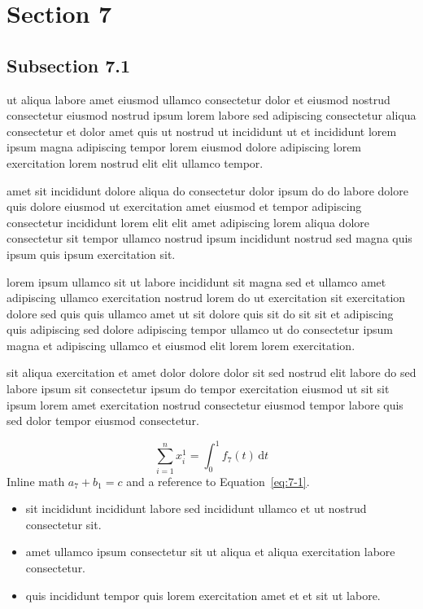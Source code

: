 \documentclass{article}
\begin{document}
\section{Section 7}\label{sec:7}
\subsection{Subsection 7.1}\label{sec:7-1}
ut aliqua labore amet eiusmod ullamco consectetur dolor et eiusmod nostrud consectetur eiusmod nostrud ipsum lorem labore sed adipiscing consectetur aliqua consectetur et dolor amet quis ut nostrud ut incididunt ut et incididunt lorem ipsum magna adipiscing tempor lorem eiusmod dolore adipiscing lorem exercitation lorem nostrud elit elit ullamco tempor.

amet sit incididunt dolore aliqua do consectetur dolor ipsum do do labore dolore quis dolore eiusmod ut exercitation amet eiusmod et tempor adipiscing consectetur incididunt lorem elit elit amet adipiscing lorem aliqua dolore consectetur sit tempor ullamco nostrud ipsum incididunt nostrud sed magna quis ipsum quis ipsum exercitation sit.

lorem ipsum ullamco sit ut labore incididunt sit magna sed et ullamco amet adipiscing ullamco exercitation nostrud lorem do ut exercitation sit exercitation dolore sed quis quis ullamco amet ut sit dolore quis sit do sit sit et adipiscing quis adipiscing sed dolore adipiscing tempor ullamco ut do consectetur ipsum magna et adipiscing ullamco et eiusmod elit lorem lorem exercitation.

sit aliqua exercitation et amet dolor dolore dolor sit sed nostrud elit labore do sed labore ipsum sit consectetur ipsum do tempor exercitation eiusmod ut sit sit ipsum lorem amet exercitation nostrud consectetur eiusmod tempor labore quis sed dolor tempor eiusmod consectetur.

\begin{equation}\label{eq:7-1}
  \sum_{i=1}^{n} x_i^{1} = \int_0^1 f_{7}(t)\,\mathrm{d}t
\end{equation}
Inline math $a_{7} + b_{1} = c$ and a reference to Equation~\eqref{eq:7-1}.

\begin{itemize}
  \item sit incididunt incididunt labore sed incididunt ullamco et ut nostrud consectetur sit.
  \item amet ullamco ipsum consectetur sit ut aliqua et aliqua exercitation labore consectetur.
  \item quis incididunt tempor quis lorem exercitation amet et et sit ut labore.
\end{itemize}
\end{document}
